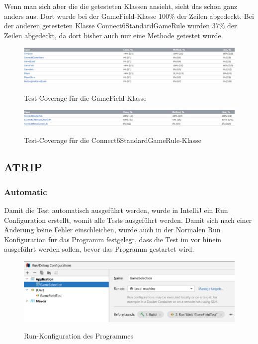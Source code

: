 \documentclass[12pt]{article}
\begin{document}
Wenn man sich aber die die getesteten Klassen ansieht, sieht das schon ganz anders aus. Dort wurde bei der GameField-Klasse 100\% der Zeilen abgedeckt. Bei der anderen getesteten Klasse Connect6StandardGameRule wurden 37\% der Zeilen abgedeckt, da dort bisher auch nur eine Methode getestet wurde. 

\begin{figure}[H]
\centering
{\includegraphics[width=13cm]{Bilder/CoverageModel}}
\caption{Test-Coverage für die GameField-Klasse}
\label{fig:CoverageModel}
\end{figure}


\begin{figure}[H]
\centering
{\includegraphics[width=13cm]{Bilder/CoverageGameRule}}
\caption{Test-Coverage für die Connect6StandardGameRule-Klasse}
\label{fig:CoverageGameRule}
\end{figure}

\subsection{ATRIP}

\subsubsection{Automatic}
Damit die Test automatisch ausgeführt werden, wurde in IntelliJ ein Run Configuration erstellt, womit alle Tests ausgeführt werden. Damit sich nach einer Änderung keine Fehler einschleichen, wurde auch in der Normalen Run Konfiguration für das Programm festgelegt, dass die Test im vor hinein ausgeführt werden sollen, bevor das Programm gestartet wird. 

\begin{figure}[H]
\centering
{\includegraphics[width=13cm]{Bilder/AutomatedTests}}
\caption{Run-Konfiguration des Programmes}
\label{fig:AutomatedTests}
\end{figure}
\end{document}
